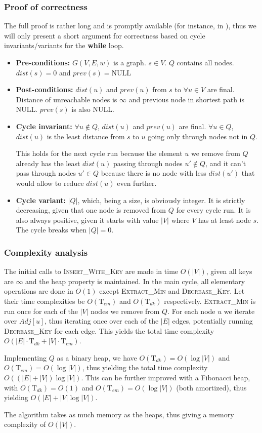 \subsubsection{Proof of correctness}
The full proof is rather long and is promptly available (for instance, in \cite[p.~659]{intro-alg}), thus we will only present a short argument for correctness based on cycle invariants/variants for the \textbf{while} loop.
\begin{itemize}
    \item \textbf{Pre-conditions:} $G(V, E, w)$ is a graph. $s \in V$. $Q$ contains all nodes. $dist(s)=0$ and $prev(s)=\text{NULL}$
    \item \textbf{Post-conditions:} $dist(u)$ and $prev(u)$ from $s$ to $\forall u \in V$ are final. Distance of unreachable nodes is $\infty$ and previous node in shortest path is NULL. $prev(s)$ is also NULL.\par
    \item \textbf{Cycle invariant:} $\forall u \not \in Q$, $dist(u)$ and $prev(u)$ are final. $\forall u \in Q$, $dist(u)$ is the least distance from $s$ to $u$ going only through nodes not in $Q$.\par
    This holds for the next cycle run because the element $u$ we remove from $Q$ already has the least $dist(u)$ passing through nodes $u' \not \in Q$, and it can't pass through nodes $u' \in Q$ because there is no node with less $dist(u')$ that would allow to reduce $dist(u)$ even further.
    \item \textbf{Cycle variant:} $|Q|$, which, being a size, is obviously integer. It is strictly decreasing, given that one node is removed from $Q$ for every cycle run. It is also always positive, given it starts with value $|V|$ where $V$ has at least node $s$. The cycle breaks when $|Q| = 0$.
\end{itemize}
\subsubsection{Complexity analysis}
The initial calls to \textsc{Insert\_With\_Key} are made in time $O(|V|)$, given all keys are $\infty$ and the heap property is maintained. In the main cycle, all elementary operations are done in $O(1)$ except \textsc{Extract\_Min} and \textsc{Decrease\_Key}. Let their time complexities be $O(\text{T}_{em})$ and $O(\text{T}_{dk})$ respectively. \textsc{Extract\_Min} is run once for each of the $|V|$ nodes we remove from $Q$. For each node $u$ we iterate over $Adj[u]$, thus iterating once over each of the $|E|$ edges, potentially running \textsc{Decrease\_Key} for each edge. This yields the total time complexity $O(|E|\cdot \text{T}_{dk}+|V|\cdot \text{T}_{em})$. \par
Implementing $Q$ as a binary heap, we have $O(\text{T}_{dk})=O(\log |V|)$ and $O(\text{T}_{em})=O(\log |V|)$, thus yielding the total time complexity $O((|E|+|V|)\log |V|)$. This can be further improved with a Fibonacci heap, with $O(\text{T}_{dk})=O(1)$ and $O(\text{T}_{em})=O(\log |V|)$ (both amortized), thus yielding $O(|E| + |V|\log |V|)$.\par
The algorithm takes as much memory as the heaps, thus giving a memory complexity of $O(|V|)$.
